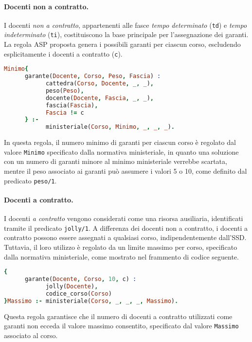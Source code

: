 \paragraph{Docenti non a contratto.}
I docenti \textit{non a contratto}, appartenenti alle fasce \textit{tempo determinato} 
(\texttt{td}) e \textit{tempo indeterminato} (\texttt{ti}), costituiscono la base principale 
per l'assegnazione dei garanti. La regola ASP proposta genera i possibili garanti per ciascun corso, 
escludendo esplicitamente i docenti a contratto (\texttt{c}).

\begin{lstlisting}[language=prolog, caption=Generazione dei garanti non a contratto.]
Minimo{
      garante(Docente, Corso, Peso, Fascia) :
            cattedra(Corso, Docente, _, _),
            peso(Peso),
            docente(Docente, Fascia, _, _),
            fascia(Fascia),
            Fascia != c
      } :-
            ministeriale(Corso, Minimo, _, _, _).
\end{lstlisting}

In questa regola, il numero minimo di garanti per ciascun corso è regolato dal valore \texttt{Minimo} 
specificato dalla normativa ministeriale, in quanto una soluzione con un numero di garanti minore al 
minimo ministeriale verrebbe scartata, mentre il peso associato ai garanti può assumere i valori 5 o 
10, come definito dal predicato \texttt{peso/1}.

\paragraph{Docenti a contratto.}
I docenti \textit{a contratto} vengono considerati come una risorsa ausiliaria, identificati tramite 
il predicato \texttt{jolly/1}. A differenza dei docenti non a contratto, i docenti a contratto possono 
essere assegnati a qualsiasi corso, indipendentemente dall'SSD. Tuttavia, il loro utilizzo è regolato 
da un limite massimo per corso, specificato dalla normativa ministeriale, come mostrato nel frammento
di codice seguente.

\begin{lstlisting}[language=prolog, caption=Generazione dei garanti a contratto.]
{     
      garante(Docente, Corso, 10, c) :
            jolly(Docente),
            codice_corso(Corso)
}Massimo :- ministeriale(Corso, _, _, _, Massimo).
\end{lstlisting}

Questa regola garantisce che il numero di docenti a contratto utilizzati come garanti non ecceda il 
valore massimo consentito, specificato dal valore \texttt{Massimo} associato al corso.


